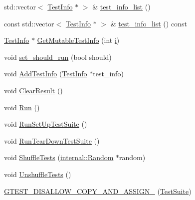 \begin{DoxyCompactItemize}
\item 
std\+::vector$<$ \mbox{\hyperlink{classtesting_1_1_test_info}{Test\+Info}} $\ast$ $>$ \& \mbox{\hyperlink{classtesting_1_1_test_suite_a9aae5da520bc0f25d67c948c0a5fa6b6}{test\+\_\+info\+\_\+list}} ()
\item 
const std\+::vector$<$ \mbox{\hyperlink{classtesting_1_1_test_info}{Test\+Info}} $\ast$ $>$ \& \mbox{\hyperlink{classtesting_1_1_test_suite_aad784d4e25767e359e6bae1ef4196404}{test\+\_\+info\+\_\+list}} () const
\item 
\mbox{\hyperlink{classtesting_1_1_test_info}{Test\+Info}} $\ast$ \mbox{\hyperlink{classtesting_1_1_test_suite_a7295cf0f654d5e9cd8a47d485e11396d}{Get\+Mutable\+Test\+Info}} (int \mbox{\hyperlink{_obj__test_2lib_2googletest-master_2googlemock_2test_2gmock-matchers__test_8cc_acb559820d9ca11295b4500f179ef6392}{i}})
\item 
void \mbox{\hyperlink{classtesting_1_1_test_suite_a783c072998fdbdfd600221823cea1de1}{set\+\_\+should\+\_\+run}} (bool should)
\item 
void \mbox{\hyperlink{classtesting_1_1_test_suite_a9d8d94a589481923b7cf6c7ce3a48f8b}{Add\+Test\+Info}} (\mbox{\hyperlink{classtesting_1_1_test_info}{Test\+Info}} $\ast$test\+\_\+info)
\item 
void \mbox{\hyperlink{classtesting_1_1_test_suite_a87bb26673c51e952e4904afcfa418c51}{Clear\+Result}} ()
\item 
void \mbox{\hyperlink{classtesting_1_1_test_suite_a16c6fb9e056f1d9113ca1e6eaf9b58bc}{Run}} ()
\item 
void \mbox{\hyperlink{classtesting_1_1_test_suite_a366c17f4d7a8c9130bfa2fc37d316e8b}{Run\+Set\+Up\+Test\+Suite}} ()
\item 
void \mbox{\hyperlink{classtesting_1_1_test_suite_adde3df6963a73760cfb53bbf69f47f29}{Run\+Tear\+Down\+Test\+Suite}} ()
\item 
void \mbox{\hyperlink{classtesting_1_1_test_suite_ab5c2055e93f43a2029e36adc5d75347a}{Shuffle\+Tests}} (\mbox{\hyperlink{classtesting_1_1internal_1_1_random}{internal\+::\+Random}} $\ast$random)
\item 
void \mbox{\hyperlink{classtesting_1_1_test_suite_afcf87bf5cf6bc373a286c0258ff39f8d}{Unshuffle\+Tests}} ()
\item 
\mbox{\hyperlink{classtesting_1_1_test_suite_a4b3b080cb92343fbd1611b621d63bbe9}{G\+T\+E\+S\+T\+\_\+\+D\+I\+S\+A\+L\+L\+O\+W\+\_\+\+C\+O\+P\+Y\+\_\+\+A\+N\+D\+\_\+\+A\+S\+S\+I\+G\+N\+\_\+}} (\mbox{\hyperlink{classtesting_1_1_test_suite}{Test\+Suite}})
\end{DoxyCompactItemize}
